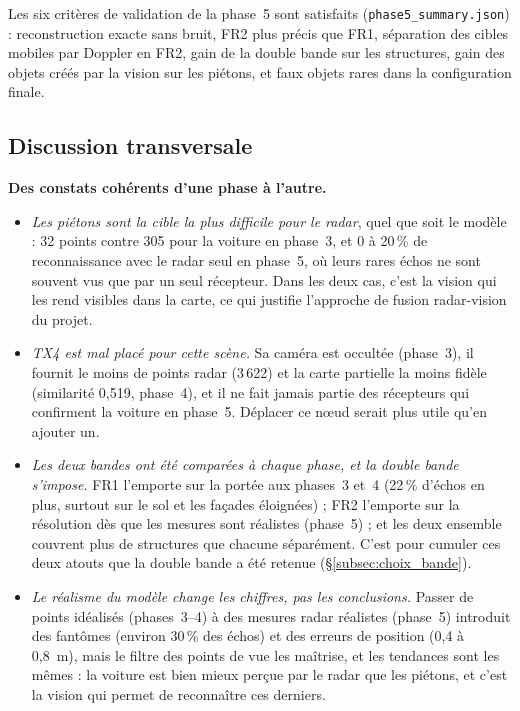 \documentclass[12pt,a4paper,titlepage]{article}
\begin{document}
Les six critères de validation de la phase~5 sont satisfaits (\texttt{phase5\_summary.json}) : reconstruction exacte sans bruit, FR2 plus précis que FR1, séparation des cibles mobiles par Doppler en FR2, gain de la double bande sur les structures, gain des objets créés par la vision sur les piétons, et faux objets rares dans la configuration finale.

\subsection{Discussion transversale}
\label{subsec:discussion}

\textbf{Des constats cohérents d'une phase à l'autre.}
\begin{itemize}[leftmargin=1.5em]
    \item \emph{Les piétons sont la cible la plus difficile pour le radar}, quel que soit le modèle : 32 points contre 305 pour la voiture en phase~3, et 0 à 20\,\% de reconnaissance avec le radar seul en phase~5, où leurs rares échos ne sont souvent vus que par un seul récepteur. Dans les deux cas, c'est la vision qui les rend visibles dans la carte, ce qui justifie l'approche de fusion radar-vision du projet.
    \item \emph{TX4 est mal placé pour cette scène.} Sa caméra est occultée (phase~3), il fournit le moins de points radar (3\,622) et la carte partielle la moins fidèle (similarité 0,519, phase~4), et il ne fait jamais partie des récepteurs qui confirment la voiture en phase~5. Déplacer ce n\oe ud serait plus utile qu'en ajouter un.
    \item \emph{Les deux bandes ont été comparées à chaque phase, et la double bande s'impose.} FR1 l'emporte sur la portée aux phases~3 et~4 (22\,\% d'échos en plus, surtout sur le sol et les façades éloignées) ; FR2 l'emporte sur la résolution dès que les mesures sont réalistes (phase~5) ; et les deux ensemble couvrent plus de structures que chacune séparément. C'est pour cumuler ces deux atouts que la double bande a été retenue (\S\ref{subsec:choix_bande}).
    \item \emph{Le réalisme du modèle change les chiffres, pas les conclusions.} Passer de points idéalisés (phases~3--4) à des mesures radar réalistes (phase~5) introduit des fantômes (environ 30\,\% des échos) et des erreurs de position (0,4 à 0,8~m), mais le filtre des points de vue les maîtrise, et les tendances sont les mêmes : la voiture est bien mieux perçue par le radar que les piétons, et c'est la vision qui permet de reconnaître ces derniers.
\end{itemize}
\end{document}
